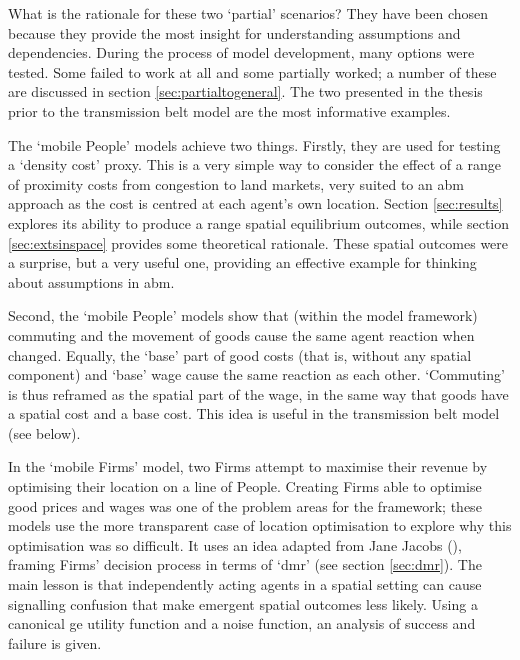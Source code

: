 What is the rationale for these two `partial' scenarios? They have been chosen because they provide the most insight for understanding assumptions and dependencies. During the process of model development, many options were tested. Some failed to work at all and some partially worked; a number of these are discussed in section \ref{sec:partialtogeneral}. The two presented in the thesis prior to the transmission belt model are the most informative examples.

The `mobile People' models achieve two things. Firstly, they are used for testing a `density cost' proxy. This is a very simple way to consider the effect of a range of proximity costs from congestion to land markets, very suited to an \gls{abm} approach as the cost is centred at each agent's own location. Section \ref{sec:results} explores its ability to produce a range spatial equilibrium outcomes, while section \ref{sec:extsinspace} provides some theoretical rationale. These spatial outcomes were a surprise, but a very useful one, providing an effective example for thinking about assumptions in \gls{abm}. 

Second, the `mobile People' models show that (within the model framework) commuting and the movement of goods cause the same agent reaction when changed. Equally, the `base' part of good costs (that is, without any spatial component) and `base' wage cause the same reaction as each other. `Commuting' is thus reframed as the spatial part of the wage, in the same way that goods have a spatial cost and a base cost. This idea is useful in the transmission belt model (see below).

In the `mobile Firms' model, two Firms attempt to maximise their revenue by optimising their location on a line of People. Creating Firms able to optimise good prices and wages was one of the problem areas for the framework; these models use the more transparent case of location optimisation to explore why this optimisation was so difficult. It uses an idea adapted from Jane Jacobs (\citeyear{jacobs_nature_2001}), framing Firms' decision process in terms of `\gls{dmr}' (see section \ref{sec:dmr}). The main lesson is that independently acting agents in a spatial setting can cause signalling confusion that make emergent spatial outcomes less likely. Using a canonical \gls{ge} utility function and a noise function, an analysis of success and failure is given. 

